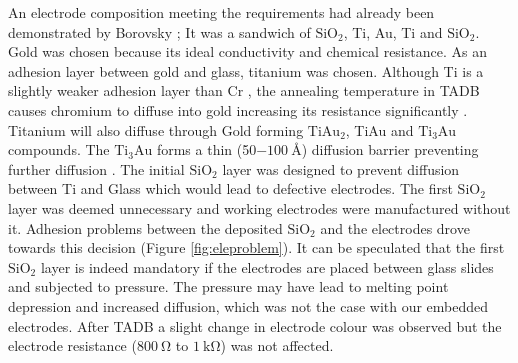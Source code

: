 \documentclass[final]{jyflluk}
\begin{document}
An electrode composition meeting the requirements had already been demonstrated by Borovsky \cite{borovsky}; It was a sandwich of $\mathrm{SiO_{2}}$, Ti, Au, Ti and $\mathrm{SiO_{2}}$. Gold was chosen because its ideal conductivity and chemical resistance. As an adhesion layer between gold and glass, titanium was chosen. Although Ti is a slightly weaker adhesion layer than Cr \cite{chen2013study}, the annealing temperature in TADB causes chromium to diffuse into gold increasing its resistance significantly \cite{huang2003effect}. Titanium will also diffuse through Gold forming  $\mathrm{TiAu_2}$, TiAu and  $\mathrm{Ti_3 Au}$ compounds. The $\mathrm{Ti_3 Au}$ forms a thin (50$- \SI{100}{\angstrom}$) diffusion barrier preventing further diffusion \cite{tisone1972diffusion}. The initial $\mathrm{SiO_2}$ layer was designed to prevent diffusion between Ti and Glass which would lead to defective electrodes.  The first $\mathrm{SiO_2}$ layer was deemed unnecessary and working electrodes were manufactured without it. Adhesion problems between the deposited $\mathrm{SiO_2}$ and the electrodes drove towards this decision (Figure \ref{fig:eleproblem}). It can be speculated that the first $\mathrm{SiO_2}$ layer is indeed mandatory if the electrodes are placed between glass slides and subjected to pressure. The pressure may have lead to melting point depression and increased diffusion, which was not the case with our embedded electrodes. After TADB a slight change in electrode colour was observed but the electrode resistance ($\SI{800}{\ohm}$ to $\SI{1}{\kilo \ohm}$) was not affected.
\end{document}
